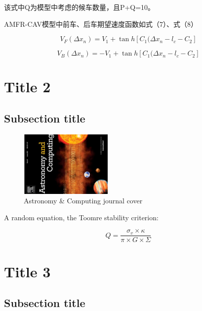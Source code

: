 \documentclass[final,5p,times,twocolumn,authoryear]{elsarticle}
\begin{document}
 \par
 该式中Q为模型中考虑的候车数量，且P+Q=10。
 \par
 AMFR-CAV模型中前车、后车期望速度函数如式（7）、式（8）
 \par
 \begin{equation}
     V_{F}(\Delta x_{n})=V_{1}+\tan h[C_{1}(\Delta x_{n}-l_{c}-C_{2}]
 \end{equation}
  \par
 \begin{equation}
     V_{B}(\Delta x_{n})=-V_{1}+\tan h[C_{1}(\Delta x_{n}-l_{c}-C_{2}]
 \end{equation}
 
\section{Title 2}
\lipsum[1]

\subsection{Subsection title}

\begin{figure}
	\centering 
	\includegraphics[width=0.4\textwidth, angle=-90]{ASCOM_journal_cover.pdf}	
	\caption{Astronomy \& Computing journal cover} 
	\label{fig_mom0}%
\end{figure}

A random equation, the Toomre stability criterion:

\begin{equation}
    Q = \frac{\sigma_v \times \kappa}{\pi \times G \times \Sigma}
\end{equation}

\section{Title 3}
\lipsum[2]

\subsection{Subsection title}
\lipsum[3]
\end{document}
